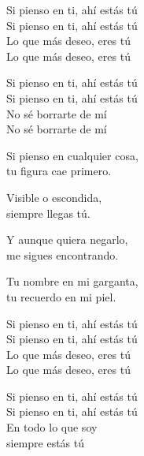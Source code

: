 \begin{lyrics}
Si pienso en ti, ahí estás tú\\
Si pienso en ti, ahí estás tú\\
Lo que más deseo, eres tú\\
Lo que más deseo, eres tú

Si pienso en ti, ahí estás tú\\
Si pienso en ti, ahí estás tú\\
No sé borrarte de mí\\
No sé borrarte de mí

Si pienso en cualquier cosa,\\
tu figura cae primero.

Visible o escondida,\\
siempre llegas tú.

Y aunque quiera negarlo,\\
me sigues encontrando.

Tu nombre en mi garganta,\\
tu recuerdo en mi piel.

Si pienso en ti, ahí estás tú\\
Si pienso en ti, ahí estás tú\\
Lo que más deseo, eres tú\\
Lo que más deseo, eres tú

Si pienso en ti, ahí estás tú\\
Si pienso en ti, ahí estás tú\\
En todo lo que soy\\
siempre estás tú

\end{lyrics}

